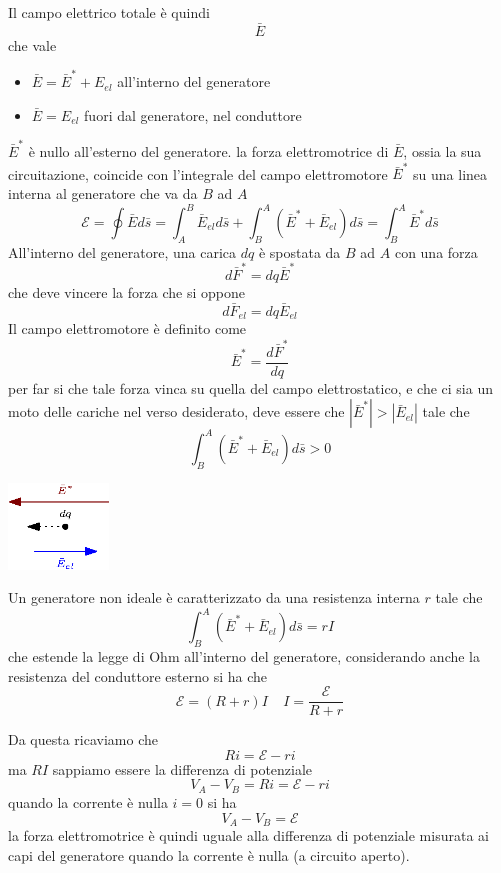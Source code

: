 \documentclass[10pt, letterpaper]{report}
\begin{document}
Il campo elettrico totale è quindi $$ \bar E$$ che vale \begin{itemize}
    \item $\bar E= \bar E^*+E_{el}$ all'interno del generatore 
    \item $\bar E= E_{el}$ fuori dal generatore, nel conduttore
\end{itemize}
$\bar E^*$ è nullo all'esterno del generatore. la forza elettromotrice di  $\bar E$, ossia la sua circuitazione, coincide con l'integrale del campo elettromotore $\bar E^*$ su una linea interna al generatore che va da $B$ ad $A$ 
$$ \mathscr{E} = \oint \bar E d\bar s = \int_A^B \bar E_{el}d\bar s + \int_B^A (\bar E^*+\bar E_{el})d\bar s = \int_B^A \bar E^*d\bar s $$
All'interno del generatore, una carica $dq$ è spostata da $B$ ad $A$ con una forza $$ d\bar F^*=dq\bar E^*$$ che deve vincere la forza che si oppone $$ d\bar F_{el}=dq\bar E_{el}$$ Il campo elettromotore è definito come 
$$ \bar E^*=\frac{d\bar F^*}{dq}$$
per far si che tale forza vinca su quella del campo elettrostatico, e che ci sia un moto delle cariche nel verso desiderato, deve essere che $|\bar E ^*|>|\bar E_{el}|$ tale che 
$$ \int_B^A (\bar E^*+\bar E_{el})d\bar s >0$$
\begin{center}
    \includegraphics[width=0.2\textwidth]{images/forzaVince.eps}
\end{center}
Un generatore non ideale è caratterizzato da una resistenza interna $r$ tale che 
$$ \int_B^A (\bar E^*+\bar E_{el})d\bar s =rI$$
che estende la legge di Ohm all'interno del generatore, considerando anche la resistenza del conduttore esterno si ha  che $$\mathscr{E} = (R+r)I\ \ \ \ \ I=\frac{\mathscr{E}}{R+r}$$

Da questa ricaviamo che $$ Ri=\mathscr{E}-ri$$
ma $RI$ sappiamo essere la differenza di potenziale 
 $$ V_A-V_B=Ri=\mathscr{E}-ri$$
 quando la corrente è nulla $i=0$ si ha 
 $$ V_A-V_B=\mathscr{E}$$
 la forza elettromotrice è quindi uguale alla differenza di potenziale misurata ai capi del generatore quando la corrente è nulla (a circuito aperto).\flowerLine 
\end{document}
